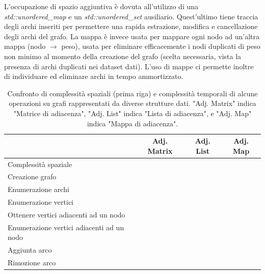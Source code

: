L'occupazione di spazio aggiuntiva è dovuta all'utilizzo di una \textit{std::unordered\_map} e un \textit{std::unordered\_set} ausiliario. Quest'ultimo tiene traccia degli archi inseriti per permettere una rapida estrazione, modifica e cancellazione degli archi del grafo. La mappa è invece usata per mappare ogni nodo ad un'altra mappa (nodo $\rightarrow{}$ peso), usata per eliminare efficacemente i nodi duplicati di peso non minimo al momento della creazione del grafo (scelta necessaria, vista la presenza di archi duplicati nei dataset dati). L'uso di mappe ci permette inoltre di individuare ed eliminare archi in tempo \complexityConstant{} ammortizzato.

\begin{table}[ht]
\centering
    \begin{tabular}{|l|ccc|}
    \hline
    &  \multicolumn{1}{c}{Adj. Matrix} & \multicolumn{1}{c}{Adj. List} & \multicolumn{1}{c|}{Adj. Map} \\
    \hline
     Complessità spaziale   & \complexityNSquared{}  & \complexityNPlusM{} & \complexityNPlusM{} \\ \hline
     
     Creazione grafo & \complexityNSquared{}  & \complexityNPlusM{} & \complexityNPlusM{} \\
     Enumerazione archi & \complexityNSquared{} & \complexityM{} & \complexityM{} \\
     Enumerazione vertici & \complexityN{} & \complexityN{} & \complexityN{} \\
     Ottenere vertici adiacenti ad un nodo & \complexityN{} & \complexityNDegree{} & \complexityConstant{} \\
     Enumerazione vertici adiacenti ad un nodo & \complexityN{} & \complexityNDegree{} &  \complexityNDegree{} \\
     Aggiunta arco & \complexityConstant{} & \complexityConstant{} & \complexityConstant{} \\
     Rimozione arco & \complexityConstant{} & \complexityM{} & \complexityConstant{} \\
    \hline
    \end{tabular}
    \caption{Confronto di complessità spaziali (prima riga) e complessità temporali di alcune operazioni su grafi rappresentati da diverse strutture dati. "Adj. Matrix" indica "Matrice di adiacenza", "Adj. List" indica "Lista di adiacenza", e "Adj. Map" indica "Mappa di adiacenza".}
    \label{table:graph-representation-comparison}
\end{table}

